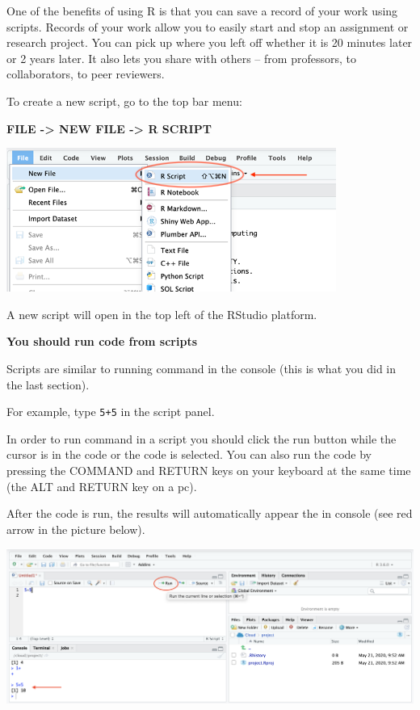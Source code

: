 \documentclass[
]{book}
\begin{document}
One of the benefits of using R is that you can save a record of your work using scripts. Records of your work allow you to easily start and stop an assignment or research project. You can pick up where you left off whether it is 20 minutes later or 2 years later. It also lets you share with others -- from professors, to collaborators, to peer reviewers.

To create a new script, go to the top bar menu:

\textbf{FILE -\textgreater{} NEW FILE -\textgreater{} R SCRIPT}

\includegraphics{img/newscript.png}

A new script will open in the top left of the RStudio platform.

\textbf{You should run code from scripts}

Scripts are similar to running command in the console (this is what you did in the last section).

For example, type \texttt{5+5} in the script panel.

In order to run command in a script you should click the run button while the cursor is in the code or the code is selected. You can also run the code by pressing the COMMAND and RETURN keys on your keyboard at the same time (the ALT and RETURN key on a pc).

After the code is run, the results will automatically appear the in console (see red arrow in the picture below).

\includegraphics{img/script.png}
\end{document}
